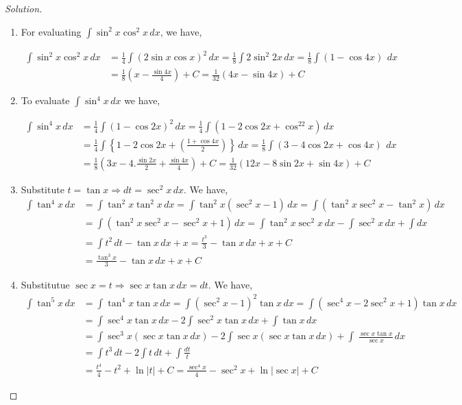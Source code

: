 \documentclass{book}
\theoremstyle{definition}
\newenvironment{solution}
    {\begin{proof}[Solution]}
    {\end{proof}}
\begin{document}
\begin{solution}
\begin{enumerate}[label=(\roman*)]
\item For evaluating $\displaystyle\int\sin^2 x\cos^2 x \, dx$, we have, 

\begin{align*}
\int\sin^2 x\cos^2 x  \, dx &=\frac{1}{4}\int(2\sin x\cos x)^2  \, dx=\frac{1}{8}\int 2\sin^2 2x  \, dx =\frac{1}{8}\int(1-\cos 4x)\  \, dx \\
&=\frac{1}{8}\left(x-\frac{\sin 4x}{4}\right)+C=\frac{1}{32}(4x-\sin 4x)+C    
\end{align*}


\item To evaluate $\displaystyle\int\sin^4 x \,dx$ we have,

\begin{align*}
    \int\sin^4 x \,dx &= \frac{1}{4}\int(1-\cos 2x)^2 \, dx = \frac{1}{4}\int (1-2\cos 2x+\cos^22x) \, dx \\ 
    &= \frac{1}{4}\int\left\{1-2\cos 2x+\left(\frac{1+\cos 4x}{2}\right)\right\} \, dx = \frac{1}{8}\int(3-4\cos 2x+\cos 4x)\  \, dx \\ 
    &= \frac{1}{8}\left(3x-4.\frac{\sin2x}{2}+\frac{\sin4x}{4}\right)+C = \frac{1}{32}(12x-8\sin 2x+\sin4x)+C
\end{align*} 

\item Substitute $t = \tan x \Rightarrow dt = \sec^2 x \, dx$. We have,
\begin{align*}
    \int \tan^4x \, dx &= \int \tan^2x\tan^2x \, dx = \int \tan^2x(\sec^2 x-1)\, dx = \int (\tan^2x\sec^2 x-\tan^2 x)\, dx \\
    &= \int (\tan^2x\sec^2 x-\sec^2 x+1)\, dx = \int \tan^2x\sec^2 x\,dx-\int \sec^2 x\,dx+\int dx \\
    &= \int t^2\,dt-\tan x\,dx+x = \frac{t^3}{3}-\tan x\,dx+x+C \\
    &= \frac{\tan^3x}{3}-\tan x\,dx+x+C
\end{align*}

\item Substitutue $\sec x=t\Rightarrow \sec x\tan x \, dx=dt$. We have,
\begin{align*}
    \int \tan^5x \, dx &= \int \tan^4x\tan x \, dx= \int (\sec^2 x-1)^2\tan x\,dx = \int (\sec^4 x-2\sec^2x+1)\tan x\,dx \\ 
    &= \int \sec^4 x\tan x\,dx-2\int \sec^2x\tan x\,dx+\int\tan x\,dx \\
    &= \int \sec^3 x(\sec x\tan x\,dx)-2\int \sec x(\sec x\tan x\,dx)+\int\ \frac{\sec x\tan x}{\sec x}\,dx \\ 
    &= \int t^3\,dt-2\int t\,dt+\int\frac{dt}{t} \\
    &= \frac{t^4}{4}-t^2+\ln|t|+C = \frac{\sec^4 x}{4}-\sec^2 x+\ln|\sec x|+C
\end{align*}

\end{enumerate}
\end{solution}
\end{document}
